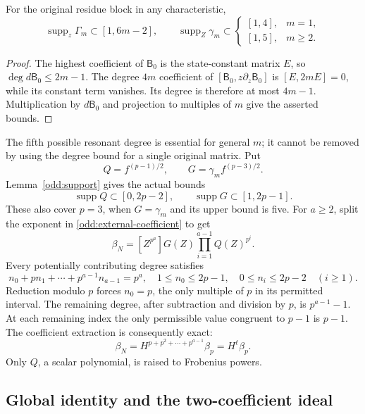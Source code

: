 \begin{lemma}
\label{odd:support}
For the original residue block in any characteristic,
\[
 \operatorname{supp}_z\Gamma_m\subset[1,6m-2],\qquad
 \operatorname{supp}_Z\gamma_m\subset
 \begin{cases}[1,4],&m=1,\\{}[1,5],&m\ge2.
 \end{cases}
\]
\end{lemma}

\begin{proof}
The highest coefficient of $\mathsf B_0$ is the state-constant
matrix $E$, so $\deg d\mathsf B_0\le2m-1$. The degree $4m$
coefficient of $[\mathsf B_0,z\partial_z\mathsf B_0]$ is
$[E,2mE]=0$, while its constant term vanishes. Its degree is
therefore at most $4m-1$. Multiplication by $d\mathsf B_0$ and
projection to multiples of $m$ give the asserted bounds.
\end{proof}

The fifth possible resonant degree is essential for general $m$;
it cannot be removed by using the degree bound for a single original
matrix. Put
\[
 Q=f^{(p-1)/2},\qquad G=\gamma_m f^{(p-3)/2}.
\]
Lemma~\ref{odd:support} gives the actual bounds
\begin{equation}
 \operatorname{supp}Q\subset[0,2p-2],\qquad
 \operatorname{supp}G\subset[1,2p-1].
 \label{odd:digit-support}
\end{equation}
These also cover $p=3$, when $G=\gamma_m$ and its upper bound is
five. For $a\ge2$, split the exponent in
\eqref{odd:external-coefficient} to get
\[
 \beta_N=[Z^{p^a}]G(Z)\prod_{i=1}^{a-1}Q(Z)^{p^i}.
\]
Every potentially contributing degree satisfies
\[
 n_0+pn_1+\cdots+p^{a-1}n_{a-1}=p^a,
 \quad 1\le n_0\le2p-1,\quad
 0\le n_i\le2p-2\quad(i\ge1).
\]
Reduction modulo $p$ forces $n_0=p$, the only multiple of $p$
in its permitted interval. The remaining degree, after subtraction
and division by $p$, is $p^{a-1}-1$. At each remaining index
the only permissible value congruent to $p-1$ is $p-1$.
The coefficient extraction is consequently exact:
\begin{equation}
 \beta_N=H^{p+p^2+\cdots+p^{a-1}}\beta_p
        =H^\ell\beta_p.
 \label{odd:external-factorisation}
\end{equation}
Only $Q$, a scalar polynomial, is raised to Frobenius powers.

\subsection{Global identity and the two-coefficient ideal}

